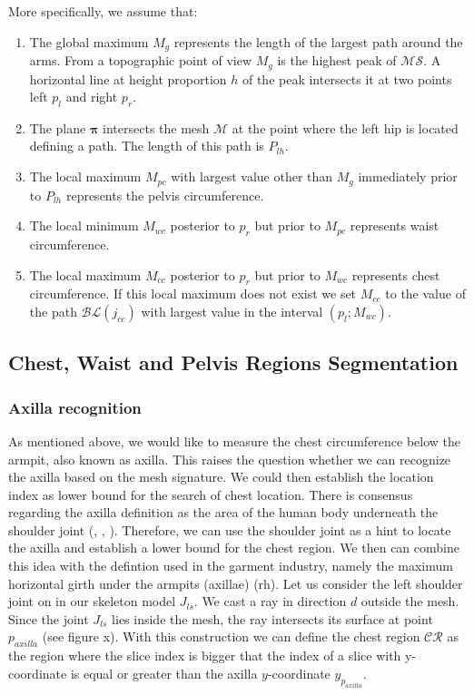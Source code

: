 \documentclass[runningheads]{llncs}
\begin{document}
More specifically, we assume that:
\begin{enumerate}
	\item The global maximum $M_g$ represents the length of the largest path 
	around the arms. From a topographic point of view $M_g$ is the highest peak 
	of $\mathcal{MS}$. A horizontal line at height proportion $h$ of the peak 
	intersects 
	it at two points left $p_l$ and right $p_r$.
	\item The plane $\boldsymbol{\pi}$ intersects the mesh $\mathcal{M}$ at the 
	point where the left hip is located defining a path. The length of this 
	path is $P_{lh}$.	
	\item The local maximum $M_{pc}$ with largest value other than $M_g$ 
	immediately prior to $P_{lh}$ represents the pelvis circumference.	
	\item The local minimum $M_{wc}$ posterior to $p_r$ but prior to $M_{pc}$ 
	represents waist circumference.
	\item The local maximum $M_{cc}$ posterior to $p_r$ but prior to $M_{wc}$ 
	represents 
	chest circumference. If this local maximum does not exist we set $M_{cc}$ 
	to the value of the path $\mathcal{BL}(j_{cc})$ with largest value in the 
	interval $(p_l; M_{wc})$.
\end{enumerate}

\subsection{Chest, Waist and Pelvis Regions 
Segmentation}\label{subsec:three_regions}

\subsubsection{Axilla recognition}\label{subsec:armpit_recog}
As mentioned above, we would like to measure the chest circumference below the 
armpit, also known as axilla. This raises the question whether we can recognize 
the axilla based on 
the mesh signature. We could then establish the location index as lower bound 
for the search of chest location. There is consensus regarding the axilla 
definition as the area of the human body underneath the shoulder joint 
(\cite{MeSH.axilla}, \cite{FMA.axilla}, \cite{TA.axilla}). Therefore, we can 
use the shoulder joint as a hint to locate the axilla and establish a lower 
bound for the chest region. We then can combine this idea with the defintion 
used in the garment industry, namely the maximum horizontal girth under the 
armpits (axillae) (rh).
Let us consider the left shoulder joint on in our skeleton model $J_{ls}$. We 
cast a ray in direction $d$ outside the mesh. Since the joint $J_{ls}$ lies 
inside the mesh, the ray intersects its surface at point $p_{axilla}$ (see 
figure x).
With this construction we can define the chest region $\mathcal{CR}$ as the 
region where the slice index is bigger that the index of a slice with 
y-coordinate is equal or greater than the axilla $y$-coordinate 
$y_{p_{axilla}}$.
\end{document}
